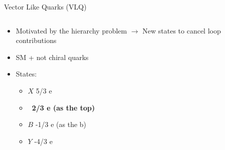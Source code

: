 

\begin{frame}{Vector Like Quarks (VLQ)}
\vspace{-.3cm}
\begin{columns}

\begin{column}{.40\textwidth}
\begin{block}{}
\begin{itemize}\scriptsize
\item Motivated by the hierarchy problem $\to$ New states to cancel loop contributions
\item SM + not chiral quarks
\item States:
  \begin{itemize}\scriptsize
  \item $X$ 5/3 e
  \item \textbf{\Tp~2/3 e (as the top)}
  \item $B$ -1/3 e (as the b)
  \item $Y$ -4/3 e
  \end{itemize}
\end{itemize}
\end{block}
\end{column}


\end{columns}
\end{frame}
